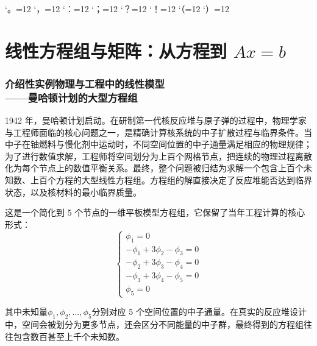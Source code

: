 \documentclass[a4paper,12pt,twoside,openany,fontset=none]{ctexbook}
\numberwithin{equation}{chapter}
\begin{document}
\par\clearpage
\endgroup

\begingroup
\catcode`。=12
\catcode`，=12
\catcode`：=12
\catcode`；=12
\catcode`？=12
\catcode`！=12
\catcode`（=12
\catcode`）=12
\chapter{线性方程组与矩阵：从方程到 $Ax=b$}
\label{chap:systems-and-matrices}
\linespread{1}\fontsize{12pt}{20pt}\selectfont
\setlength{\parindent}{2em}
\setlength{\parskip}{4pt}
\setlength{\abovedisplayskip}{9pt}
\setlength{\belowdisplayskip}{9pt}
\captionsetup[figure]{font=small,labelfont=bf,skip=7pt}
\renewcommand{\thefigure}{\thechapter.\arabic{figure}}

\subsection*{介绍性实例\quad 物理与工程中的线性模型\\[4pt]——曼哈顿计划的大型方程组}

1942 年，曼哈顿计划启动。在研制第一代核反应堆与原子弹的过程中，物理学家与工程师面临的核心问题之一，是精确计算核系统的中子扩散过程与临界条件。当中子在铀燃料与慢化剂中运动时，不同空间位置的中子通量满足相应的物理规律；为了进行数值求解，工程师将空间划分为上百个网格节点，把连续的物理过程离散化为每个节点上的数值平衡关系。最终，整个问题被归结为求解一个包含上百个未知数、上百个方程的大型线性方程组。方程组的解直接决定了反应堆能否达到临界状态，以及核材料的最小临界质量。

这是一个简化到 5 个节点的一维平板模型方程组，它保留了当年工程计算的核心形式：
\[
\begin{cases}
    \phi_1=0\\[4pt]
    -\phi_1+3\phi_2-\phi_3=0\\[4pt]
    -\phi_2+3\phi_3-\phi_4=0\\[4pt]
    -\phi_3+3\phi_4-\phi_5=0\\[4pt]
    \phi_5=0
\end{cases}
\]

其中未知量$\phi_1,\phi_2,\dots,\phi_5$分别对应 5 个空间位置的中子通量。在真实的反应堆设计中，空间会被划分为更多节点，还会区分不同能量的中子群，最终得到的方程组往往包含数百甚至上千个未知数。
\end{document}
